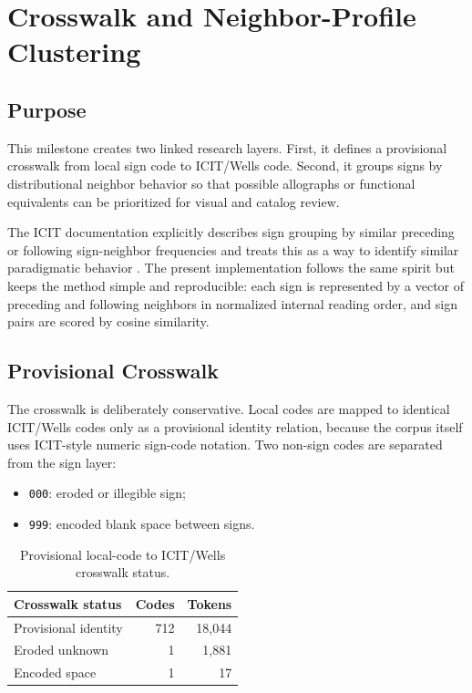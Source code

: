 \section{Crosswalk and Neighbor-Profile Clustering}

\subsection{Purpose}

This milestone creates two linked research layers. First, it defines a provisional crosswalk from local sign code to ICIT/Wells code. Second, it groups signs by distributional neighbor behavior so that possible allographs or functional equivalents can be prioritized for visual and catalog review.

The ICIT documentation explicitly describes sign grouping by similar preceding or following sign-neighbor frequencies and treats this as a way to identify similar paradigmatic behavior \citep{fulsICIT}. The present implementation follows the same spirit but keeps the method simple and reproducible: each sign is represented by a vector of preceding and following neighbors in normalized internal reading order, and sign pairs are scored by cosine similarity.

\subsection{Provisional Crosswalk}

The crosswalk is deliberately conservative. Local codes are mapped to identical ICIT/Wells codes only as a provisional identity relation, because the corpus itself uses ICIT-style numeric sign-code notation. Two non-sign codes are separated from the sign layer:

\begin{itemize}
  \item \texttt{000}: eroded or illegible sign;
  \item \texttt{999}: encoded blank space between signs.
\end{itemize}

\begin{table}[htbp]
\centering
\begin{tabular}{lrr}
\toprule
\textbf{Crosswalk status} & \textbf{Codes} & \textbf{Tokens} \\
\midrule
Provisional identity & 712 & 18,044 \\
Eroded unknown & 1 & 1,881 \\
Encoded space & 1 & 17 \\
\bottomrule
\end{tabular}
\caption{Provisional local-code to ICIT/Wells crosswalk status.}
\label{tab:crosswalk-status}
\end{table}

